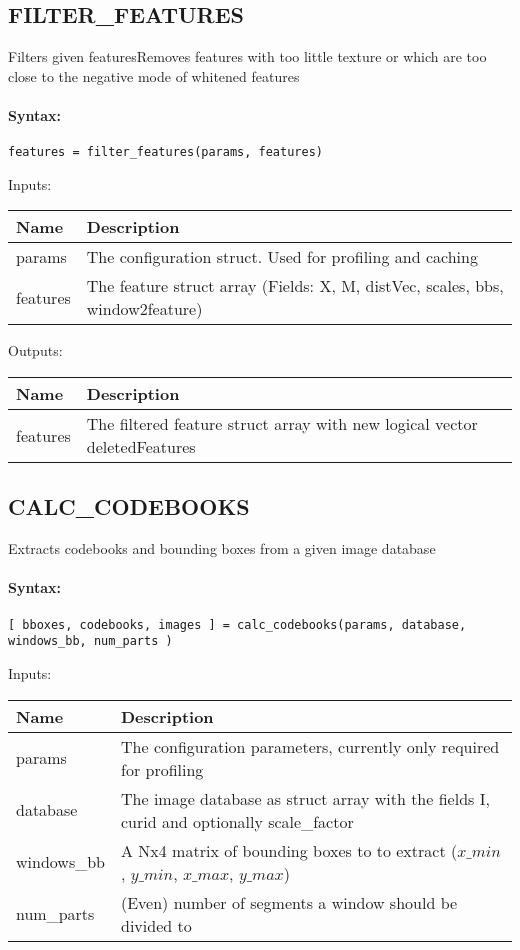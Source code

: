 \subsection{FILTER\_FEATURES}

Filters given featuresRemoves features with too little texture or which are too close to the negative mode of whitened features

\paragraph{Syntax:} \verb|features = filter_features(params, features)|

\bigskip
Inputs:

\begin{tabular}{|p{}|p{}|}
\hline
\textbf{Name} & \textbf{Description} \\
\hline \hline
params & The configuration struct. Used for profiling and caching  \\ \hline
features & The feature struct array (Fields: X, M, distVec, scales, bbs, window2feature)  \\ \hline
\end{tabular}

\bigskip
Outputs:

\begin{tabular}{|p{}|p{}|}
\hline
\textbf{Name} & \textbf{Description} \\
\hline \hline
features & The filtered feature struct array with new logical vector deletedFeatures  \\ \hline
\end{tabular}

\subsection{CALC\_CODEBOOKS}

Extracts codebooks and bounding boxes from a given image database

\paragraph{Syntax:} \verb|[ bboxes, codebooks, images ] = calc_codebooks(params, database, windows_bb, num_parts )|

\bigskip
Inputs:

\begin{tabular}{|p{}|p{}|}
\hline
\textbf{Name} & \textbf{Description} \\
\hline \hline
params & The configuration parameters, currently only required for profiling  \\ \hline
database & The image database as struct array with the fields I, curid and optionally scale\_factor  \\ \hline
windows\_bb & A Nx4 matrix of bounding boxes to to extract ($x\_{min}$, $y\_{min}$, $x\_{max}$, $y\_{max}$)  \\ \hline
num\_parts & (Even) number of segments a window should be divided to  \\ \hline
\end{tabular}

